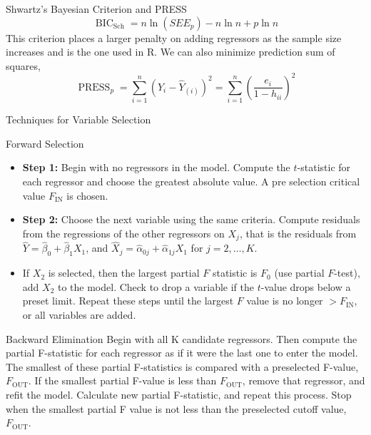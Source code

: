 \documentclass{article}
\DeclareMathOperator{\bic}{BIC}
\DeclareMathOperator{\sch}{Sch}
\DeclareMathOperator{\press}{PRESS}
\DeclareMathOperator{\fin}{IN}
\DeclareMathOperator{\fout}{OUT}
\begin{document}
\begin{multicols*}{3}
\begin{blackbox}{Shwartz's Bayesian Criterion and PRESS}
            \[\bic_{\sch} = n\ln (SEE_p) - n \ln n + p \ln n\]
            This criterion places a larger penalty on adding regressors as the sample size increases and is the one used in R. We can also minimize prediction sum of squares,
            \[\press_p = \sum_{i=1}^n(Y_i - \hat{Y}_{(i)})^2 = \sum_{i=1}^n\left(\frac{e_i}{1-h_{ii}}\right)^2\]
        \end{blackbox}
        \begin{blackbox}{Techniques for Variable Selection}
            \begin{redbox}{Forward Selection}
                \begin{itemize}[leftmargin=7pt]
                    \item \textbf{Step 1:} Begin with no regressors in the model. Compute the $t$-statistic for each regressor and choose the greatest absolute value. A pre selection critical value $F_{\fin}$ is chosen. 
                    \item \textbf{Step 2:} Choose the next variable using the same criteria. Compute residuals from the regressions of the other regressors on $X_j$, that is the residuals from $\hat{Y} = \hat{\beta}_0 + \hat{\beta}_1X_1$, and $\hat{X}_j = \hat{\alpha}_{0j} + \hat{\alpha}_{1j}X_1$ for $j = 2, \ldots, K$.
                    \item If $X_2$ is selected, then the largest partial $F$ statistic is $F_0$ (use partial $F$-test), add $X_2$ to the model. Check to drop a variable if the $t$-value drops below a preset limit. Repeat these steps until the largest $F$ value is no longer $> F_{\fin}$, or all variables are added.
                \end{itemize}
                \vspace{-2ex}
            \end{redbox}
            \begin{brownbox}{Backward Elimination}
                Begin with all K candidate regressors. Then compute the partial F-statistic for each regressor as if it were the last one to enter the model. The smallest of these partial F-statistics is compared with a preselected F-value, $F_{\fout}$. If the smallest partial F-value is less than $F_{\fout}$, remove that regressor, and refit the model. Calculate new partial F-statistic, and repeat this process. Stop when the smallest partial F value is not less than the preselected cutoff value, $F_{\fout}$. 
                \vspace{-1ex}
            \end{brownbox}

\end{blackbox}
\end{multicols*}
\end{document}
